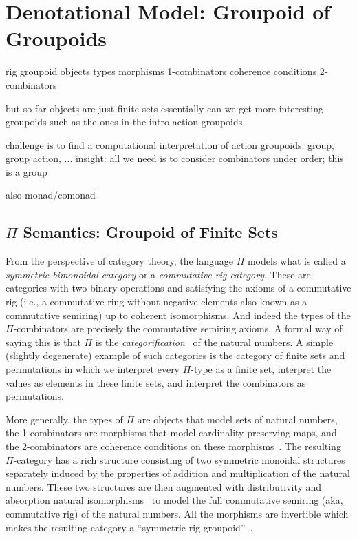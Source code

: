 \section{Denotational Model: Groupoid of Groupoids}
\label{sec:groupoids}

rig groupoid
objects types
morphisms 1-combinators
coherence conditions 2-combinators

but so far objects are just finite sets essentially
can we get more interesting groupoids such as the ones in the intro
action groupoids

challenge is to find a computational interpretation of action
groupoids: group, group action, ... insight: all we need is to
consider combinators under order; this is a group

also monad/comonad

\subsection{$\Pi$ Semantics: Groupoid of Finite Sets}

From the perspective of category theory, the language $\Pi$ models
what is called a \emph{symmetric bimonoidal category} or a
\emph{commutative rig category}. These are categories with two binary
operations and satisfying the axioms of a commutative rig (i.e., a
commutative ring without negative elements also known as a commutative
semiring) up to coherent isomorphisms. And indeed the types of the
$\Pi$-combinators are precisely the commutative semiring axioms. A
formal way of saying this is that $\Pi$ is the
\emph{categorification}~\cite{math/9802029} of the natural numbers. A
simple (slightly degenerate) example of such categories is the
category of finite sets and permutations in which we interpret every
$\Pi$-type as a finite set, interpret the values as elements in these
finite sets, and interpret the combinators as permutations.

More generally, the types of $\Pi$ are objects that model sets of
natural numbers, the 1-combinators are morphisms that model
cardinality-preserving maps, and the 2-combinators are coherence
conditions on these morphisms~\cite{Carette2016}. The resulting
$\Pi$-category has a rich structure consisting of two symmetric
monoidal structures~\cite{nla.cat-vn1051288} separately induced by the
properties of addition and multiplication of the natural
numbers. These two structures are then augmented with distributivity
and absorption natural isomorphisms~\cite{laplaza} to model the full
commutative semiring (aka, commutative rig) of the natural
numbers. All the morphisms are invertible which makes the resulting
category a ``symmetric rig groupoid''~\cite{nlabrig}.

